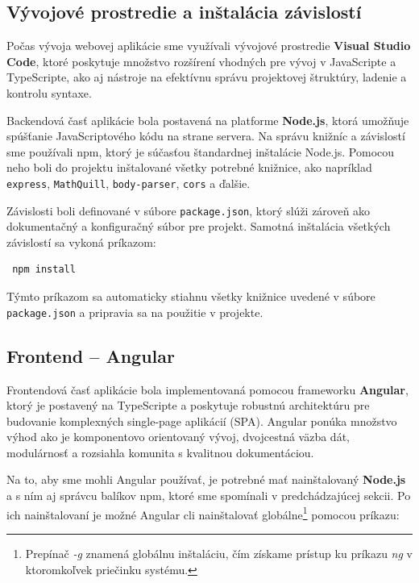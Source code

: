 \subsection{Vývojové prostredie a inštalácia závislostí}

 Počas vývoja webovej aplikácie sme využívali vývojové prostredie \textbf{Visual Studio Code}\cite{vscode}, ktoré poskytuje množstvo rozšírení vhodných pre vývoj v JavaScripte a TypeScripte, ako aj nástroje na efektívnu správu projektovej štruktúry, ladenie a kontrolu syntaxe.
 
 Backendová časť aplikácie bola postavená na platforme \textbf{Node.js}, ktorá umožňuje spúšťanie JavaScriptového kódu na strane servera. Na správu knižníc a závislostí sme používali \acrfull{npm}, ktorý je súčasťou štandardnej inštalácie Node.js. 
 Pomocou neho boli do projektu inštalované všetky potrebné knižnice, ako napríklad \texttt{express}, \texttt{MathQuill}, \texttt{body-parser}, \texttt{cors} a ďalšie.
  
 Závislosti boli definované v súbore \texttt{package.json}, ktorý slúži zároveň ako dokumentačný a konfiguračný súbor pre projekt. Samotná inštalácia všetkých závislostí sa vykoná príkazom:
 
 \begin{verbatim}
 npm install
 \end{verbatim}
 
 Týmto príkazom sa automaticky stiahnu všetky knižnice uvedené v súbore \texttt{package.json} a pripravia sa na použitie v projekte.
 
 \subsection{Frontend – Angular }

Frontendová časť aplikácie bola implementovaná pomocou frameworku \textbf{Angular}, ktorý je postavený na TypeScripte a poskytuje robustnú architektúru pre budovanie komplexných single-page aplikácií (SPA).
 Angular ponúka množstvo výhod ako je komponentovo orientovaný vývoj, dvojcestná väzba dát, modulárnosť a rozsiahla komunita s kvalitnou dokumentáciou.

\bigskip
Na to, aby sme mohli Angular používať, je potrebné mať nainštalovaný \textbf{Node.js} a s ním aj správcu balíkov \acrshort{npm}, ktoré sme spomínali v predchádzajúcej sekcii. 
Po ich nainštalovaní je možné Angular \acrshort{cli} nainštalovať globálne\footnote{Prepínač \textit{-g} znamená globálnu inštaláciu, čím získame prístup ku príkazu \textit{ng} v ktoromkoľvek priečinku systému.}
pomocou príkazu:

